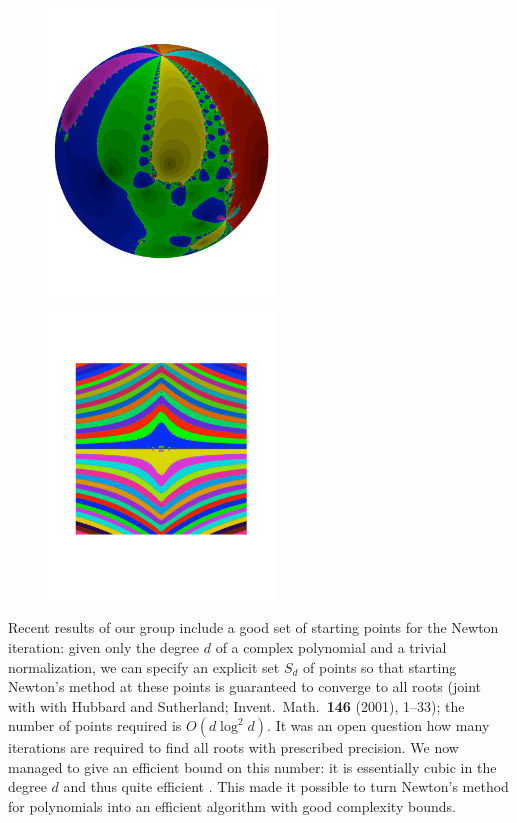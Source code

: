 \begin{figure}[ht]
  \begin{center}
    \includegraphics[width=6cm,viewport=018 120 600 700,clip]{Schleicher/Schleicher_2006_Fig1.pdf}
    \includegraphics[width=6cm,viewport=050 180 530 630,clip]{Schleicher/Schleicher_2006_Fig2.pdf}
    \label{fig:prof_Schleicher}
   \end{center}
\end{figure}
Recent results of our group include a good set of starting points for the Newton iteration: given only the degree $d$ of a complex polynomial and a trivial normalization, we can specify an explicit set $S_d$ of points so that starting Newton's method at these points is guaranteed to converge to all roots (joint with with Hubbard and Sutherland; Invent.\ Math.\ {\bf 146} (2001), 1--33); the number of points required is $O(d\log^2d)$. It was an open question how many iterations are required to find all roots with prescribed precision. We now managed to give an efficient bound on this number: it is essentially cubic in the degree $d$ and thus quite efficient \cite{NewtonOutline}. This made it possible to turn Newton's method for polynomials into an efficient algorithm with good complexity bounds.

